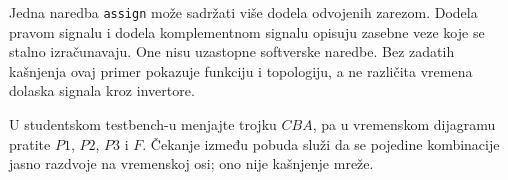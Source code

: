 
Jedna naredba \texttt{assign} može sadržati više dodela odvojenih zarezom. Dodela pravom signalu i dodela komplementnom signalu opisuju zasebne veze koje se stalno izračunavaju. One nisu uzastopne softverske naredbe. Bez zadatih kašnjenja ovaj primer pokazuje funkciju i topologiju, a ne različita vremena dolaska signala kroz invertore.

U studentskom testbench-u menjajte trojku \(CBA\), pa u vremenskom dijagramu pratite \(P1\), \(P2\), \(P3\) i \(F\). Čekanje između pobuda služi da se pojedine kombinacije jasno razdvoje na vremenskoj osi; ono nije kašnjenje mreže.
